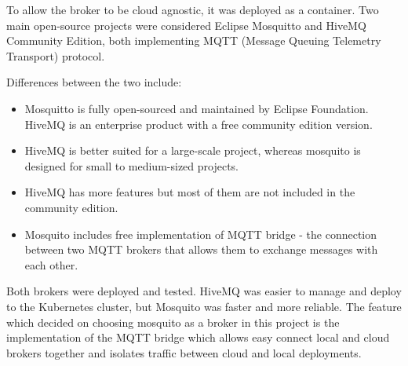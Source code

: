 To allow the broker to be cloud agnostic, it was deployed as a container. Two main open-source projects were considered Eclipse Mosquitto and HiveMQ Community Edition, both implementing MQTT (Message Queuing Telemetry Transport) protocol.

Differences between the two include:

\begin{itemize}
    \item Mosquitto is fully open-sourced and maintained by Eclipse Foundation. HiveMQ is an enterprise product with a free community edition version.
    \item HiveMQ is better suited for a large-scale project, whereas mosquito is designed for small to medium-sized projects.
    \item HiveMQ has more features but most of them are not included in the community edition.
    \item Mosquito includes free implementation of MQTT bridge - the connection between two MQTT brokers that allows them to exchange messages with each other.
\end{itemize}

Both brokers were deployed and tested. HiveMQ was easier to manage and deploy to the Kubernetes cluster, but Mosquito was faster and more reliable. The feature which decided on choosing mosquito as a broker in this project is the implementation of the MQTT bridge which allows easy connect local and cloud brokers together and isolates traffic between cloud and local deployments.